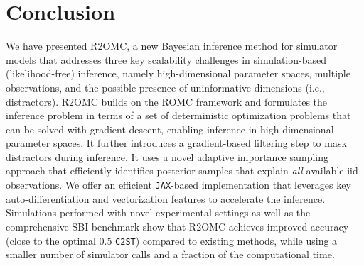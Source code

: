 \documentclass[twoside]{article}
\newcommand{\thb}{\boldsymbol{\theta}}
\newcommand{\data}{\mathbf{y}^o}
\newcommand{\rromc}{R2OMC}
\begin{document}
\section{Conclusion}
\label{sec:conclusion}

We have presented \rromc, a new Bayesian inference method for simulator models that addresses three key scalability challenges in simulation-based (likelihood-free) inference, namely high-dimensional parameter spaces, multiple observations, and the possible presence of uninformative dimensions (i.e., distractors). R2OMC builds on the ROMC framework and formulates the inference problem in terms of a set of deterministic optimization problems that can be solved with gradient-descent, enabling inference in high-dimensional parameter spaces. It further introduces a gradient-based filtering step to mask distractors during inference. It uses a novel adaptive importance sampling approach that efficiently identifies posterior samples that explain \emph{all} available iid observations. We offer an efficient \texttt{JAX}-based implementation that leverages key auto-differentiation and vectorization features to accelerate the inference. Simulations performed with novel experimental settings as well as the comprehensive SBI benchmark show that R2OMC achieves improved accuracy (close to the optimal $0.5$ \texttt{C2ST}) compared to existing methods, while using a smaller number of simulator calls and a fraction of the computational time. 





\end{document}
